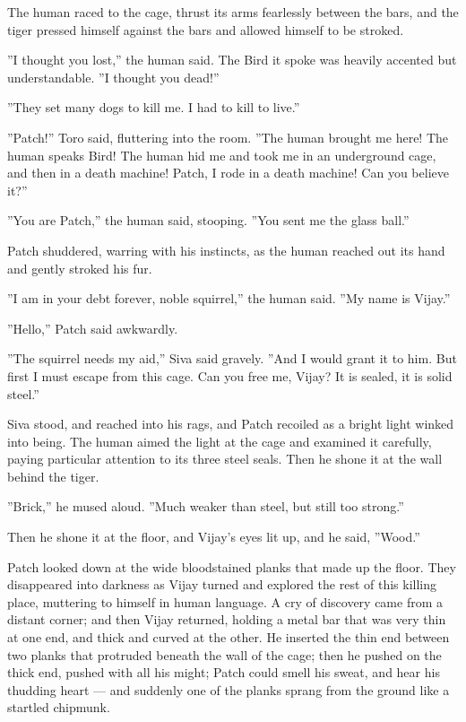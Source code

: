 \documentclass[12pt]{book}
\begin{document}
The human raced to the cage, thrust its arms fearlessly between the
bars, and the tiger pressed himself against the bars and allowed
himself to be stroked.

''I thought you lost,'' the human said. The Bird it spoke was heavily
accented but understandable. ''I thought you dead!''

''They set many dogs to kill me. I had to kill to live.''

''Patch!'' Toro said, fluttering into the room. ''The human brought me
here! The human speaks Bird! The human hid me and took me in an
underground cage, and then in a death machine! Patch, I rode in a
death machine! Can you believe it?''

''You are Patch,'' the human said, stooping. ''You sent me the glass
ball.''

Patch shuddered, warring with his instincts, as the human reached out
its hand and gently stroked his fur.

''I am in your debt forever, noble squirrel,'' the human said. ''My
name is Vijay.''

''Hello,'' Patch said awkwardly.

''The squirrel needs my aid,'' Siva said gravely. ''And I would grant
it to him. But first I must escape from this cage. Can you free me,
Vijay? It is sealed, it is solid steel.''

Siva stood, and reached into his rags, and Patch recoiled as a bright
light winked into being. The human aimed the light at the cage and
examined it carefully, paying particular attention to its three steel
seals. Then he shone it at the wall behind the tiger.

''Brick,'' he mused aloud. ''Much weaker than steel, but still too
strong.''

Then he shone it at the floor, and Vijay's eyes lit up, and he said,
''Wood.''

Patch looked down at the wide bloodstained planks that made up the
floor. They disappeared into darkness as Vijay turned and explored the
rest of this killing place, muttering to himself in human language. A
cry of discovery came from a distant corner; and then Vijay returned,
holding a metal bar that was very thin at one end, and thick and
curved at the other. He inserted the thin end between two planks that
protruded beneath the wall of the cage; then he pushed on the thick
end, pushed with all his might; Patch could smell his sweat, and hear
his thudding heart --- and suddenly one of the planks sprang from the
ground like a startled chipmunk.
\end{document}

